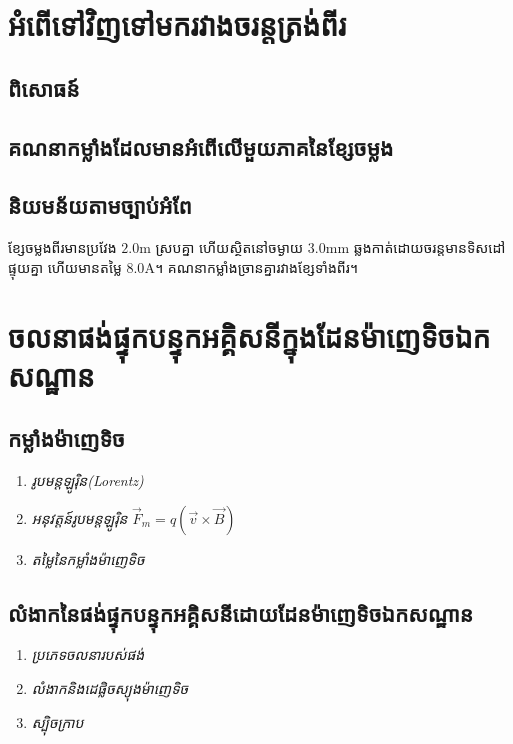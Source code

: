 \section{អំពើទៅវិញទៅមករវាងចរន្តត្រង់ពីរ}
\subsection{ពិសោធន៍}
\subsection{គណនាកម្លាំងដែលមានអំពើលើមួយភាគនៃខ្សែចម្លង}
\subsection{និយមន័យតាមច្បាប់អំពែ}
\begin{example}
	ខ្សែចម្លងពីរមានប្រវែង $2.0\si{\metre}$ ស្របគ្នា ហើយស្ថិតនៅចម្ងាយ $3.0\si{\milli\metre}$ ឆ្លងកាត់ដោយចរន្តមានទិសដៅផ្ទុយគ្នា ហើយមានតម្លៃ $8.0\si{\ampere}$។ គណនាកម្លាំងច្រានគ្នារវាងខ្សែទាំងពីរ។
\end{example}
\section{ចលនាផង់ផ្ទុកបន្ទុកអគ្គិសនីក្នុងដែនម៉ាញេទិចឯកសណ្ឋាន}
\subsection{កម្លាំងម៉ាញេទិច}
\begin{enumerate}[k]
	\item \emph{\kml រូបមន្តឡូរ៉ិន{\en(Lorentz)}}
	\item \emph{\kml អនុវត្តន៍រូបមន្តឡូរ៉ិន} $\vec{F}_{m}=q\left(\vec{v}\times\vec{B}\right)$
	\item \emph{\kml តម្លៃនៃកម្លាំងម៉ាញេទិច}
\end{enumerate}
\subsection{លំងាកនៃផង់ផ្ទុកបន្ទុកអគ្គិសនីដោយដែនម៉ាញេទិចឯកសណ្ឋាន}
\begin{enumerate}[k]
	\item \emph{\kml ប្រភេទចលនារបស់ផង់}
	\item \emph{\kml លំងាកនិងដេផ្លិចស្យុងម៉ាញេទិច}
	\item \emph{\kml ស្ប៉ិចក្រាប}
\end{enumerate}
